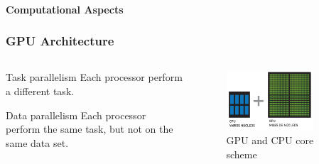 \begin{frame}
    \framesubtitle{Computational Aspects}
    \frametitle{GPU Architecture}

    \begin{columns}
        \begin{column}{0.5\textwidth}
            \begin{block}{Task parallelism}
                Each processor perform a different task.
            \end{block}
            \begin{block}{Data parallelism}
                Each processor perform the same task, but not on the same data set.
            \end{block}
        \end{column}
        \begin{column}{0.5\textwidth}
             \begin{figure}
                 \centering
                 \includegraphics[width=0.8\textwidth]{img/cpu_gpu}
                 \caption{GPU and CPU core scheme}
                 \label{fig:core-scheme}
             \end{figure}
        \end{column}
    \end{columns}
\end{frame}

